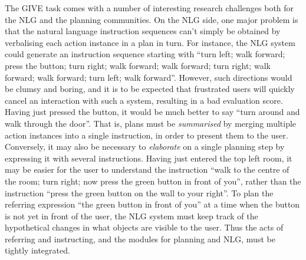 The GIVE task comes with a number of interesting research challenges
both for the NLG and the planning communities.  On the NLG side, one
major problem is that the natural language instruction sequences can't
simply be obtained by verbalising each action instance in a plan in turn.
For instance, the NLG system could generate an instruction sequence
starting with ``turn left; walk forward; press the button; turn right; walk
forward; walk forward; turn right; walk forward; walk forward; turn left;
walk forward''.  However, such directions would be clumsy and boring, and
it is to be expected that frustrated users will quickly cancel an
interaction with such a system, resulting in a bad evaluation score.
Having just pressed the button, it would be much better to say ``turn
around and walk through the door''. That is, plans must be
\emph{summarised} by merging multiple action instances into a single
instruction, in order to present them to the user. Conversely, it may also
be necessary to \emph{elaborate} on a single planning step by expressing it
with several instructions.  Having just entered the top left room, it may
be easier for the user to understand the instruction ``walk to the centre
of the room; turn right; now press the green button in front of you'',
rather than the instruction ``press the green button on the wall to your
right''.  To plan the referring expression ``the green button in front of
you'' at a time when the button is not yet in front of the user, the NLG
system must keep track of the hypothetical changes in what objects are
visible to the user.  Thus the acts of referring and instructing, and the
modules for planning and NLG, must be tightly integrated.

